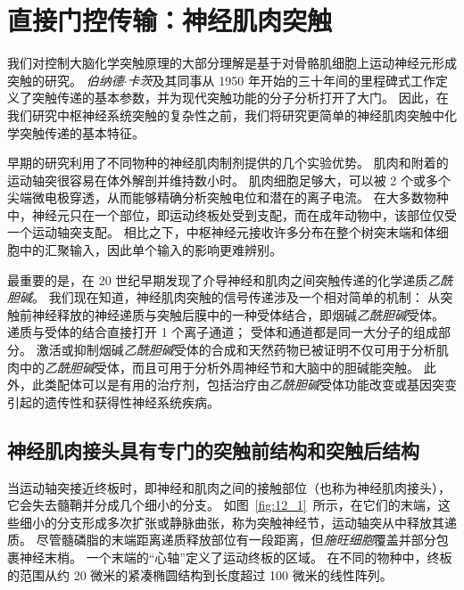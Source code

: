 \chapter{直接门控传输：神经肌肉突触} \label{chap:chap12}


我们对控制大脑化学突触原理的大部分理解是基于对骨骼肌细胞上运动神经元形成突触的研究。
\textit{伯纳德$\cdot$卡茨}及其同事从 1950 年开始的三十年间的里程碑式工作定义了突触传递的基本参数，并为现代突触功能的分子分析打开了大门。
因此，在我们研究中枢神经系统突触的复杂性之前，我们将研究更简单的神经肌肉突触中化学突触传递的基本特征。


早期的研究利用了不同物种的神经肌肉制剂提供的几个实验优势。
肌肉和附着的运动轴突很容易在体外解剖并维持数小时。
肌肉细胞足够大，可以被 2 个或多个尖端微电极穿透，从而能够精确分析突触电位和潜在的离子电流。
在大多数物种中，神经元只在一个部位，即运动终板处受到支配，而在成年动物中，该部位仅受一个运动轴突支配。
相比之下，中枢神经元接收许多分布在整个树突末端和体细胞中的汇聚输入，因此单个输入的影响更难辨别。


最重要的是，在 20 世纪早期发现了介导神经和肌肉之间突触传递的化学递质\textit{乙酰胆碱}。
我们现在知道，神经肌肉突触的信号传递涉及一个相对简单的机制：
从突触前神经释放的神经递质与突触后膜中的一种受体结合，即烟碱\textit{乙酰胆碱}受体。
递质与受体的结合直接打开 1 个离子通道；
受体和通道都是同一大分子的组成部分。
激活或抑制烟碱\textit{乙酰胆碱}受体的合成和天然药物已被证明不仅可用于分析肌肉中的\textit{乙酰胆碱}受体，而且可用于分析外周神经节和大脑中的胆碱能突触。
此外，此类配体可以是有用的治疗剂，包括治疗由\textit{乙酰胆碱}受体功能改变或基因突变引起的遗传性和获得性神经系统疾病。



\section{神经肌肉接头具有专门的突触前结构和突触后结构}

当运动轴突接近终板时，即神经和肌肉之间的接触部位（也称为神经肌肉接头），它会失去髓鞘并分成几个细小的分支。
如图~\ref{fig:12_1}~所示，在它们的末端，这些细小的分支形成多次扩张或静脉曲张，称为突触神经节，运动轴突从中释放其递质。
尽管髓磷脂的末端距离递质释放部位有一段距离，但\textit{施旺细胞}覆盖并部分包裹神经末梢。
一个末端的“心轴”定义了运动终板的区域。
在不同的物种中，终板的范围从约 20 微米的紧凑椭圆结构到长度超过 100 微米的线性阵列。


